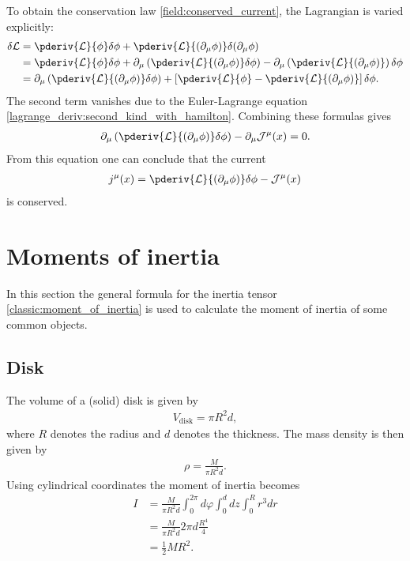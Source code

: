     To obtain the conservation law \eqref{field:conserved_current}, the Lagrangian is varied explicitly:
    \begin{align*}
        \delta\mathcal{L} &= \pderiv{\mathcal{L}}{\phi}\delta\phi + \pderiv{\mathcal{L}}{(\partial_\mu\phi)}\delta(\partial_\mu\phi)\\
        &= \pderiv{\mathcal{L}}{\phi}\delta\phi + \partial_\mu\left(\pderiv{\mathcal{L}}{(\partial_\mu\phi)}\delta\phi\right) - \partial_\mu\left(\pderiv{\mathcal{L}}{(\partial_\mu\phi)}\right)\delta\phi\\
        &= \partial_\mu\left(\pderiv{\mathcal{L}}{(\partial_\mu\phi)}\delta\phi\right) + \left[\pderiv{\mathcal{L}}{\phi} - \pderiv{\mathcal{L}}{(\partial_\mu\phi)}\right]\delta\phi.
    \end{align*}
    The second term vanishes due to the Euler-Lagrange equation \eqref{lagrange_deriv:second_kind_with_hamilton}. Combining these formulas gives
    \begin{gather}
        \partial_\mu\left(\pderiv{\mathcal{L}}{(\partial_\mu\phi)}\delta\phi\right) - \partial_\mu\mathcal{J}^\mu(x) = 0.
    \end{gather}
    From this equation one can conclude that the current
    \begin{gather}
        j^\mu(x) = \pderiv{\mathcal{L}}{(\partial_\mu\phi)}\delta\phi - \mathcal{J}^\mu(x)
    \end{gather}
    is conserved.

\section{Moments of inertia}\label{deriv:inertia}

    In this section the general formula for the inertia tensor \ref{classic:moment_of_inertia} is used to calculate the moment of inertia of some common objects.

\subsection{Disk}

    The volume of a (solid) disk is given by
    \begin{gather}
        V_\mathrm{disk} = \pi R^2d,
    \end{gather}
    where $R$ denotes the radius and $d$ denotes the thickness. The mass density is then given by
    \begin{gather}
        \rho = \frac{M}{\pi R^2d}.
    \end{gather}
    Using cylindrical coordinates the moment of inertia becomes
    \begin{align}
        I &= \frac{M}{\pi R^2d}\int_0^{2\pi}d\varphi\int_0^ddz\int_0^Rr^3dr\nonumber\\
        &= \frac{M}{\pi R^2d}2\pi d\frac{R^4}{4}\nonumber\\
        &= \frac{1}{2}MR^2.
    \end{align}

